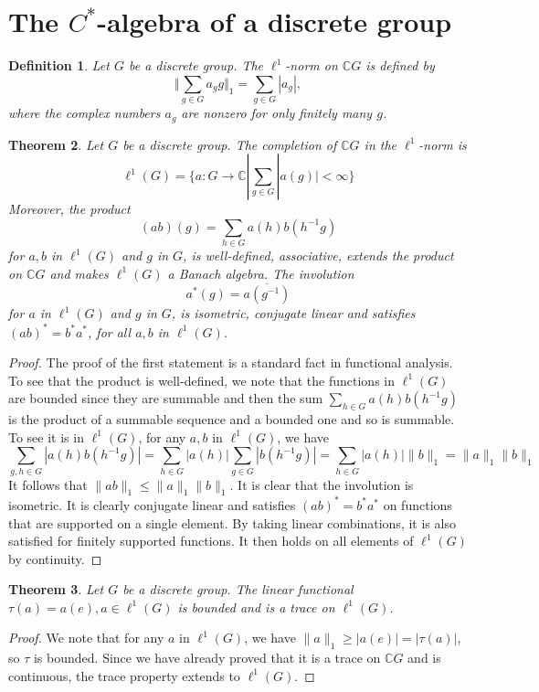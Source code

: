 \documentclass{book}
\newtheorem{definition}{Definition}[section]
\newtheorem{theorem}[definition]{Theorem}
\begin{document}
\section{The \texorpdfstring{\(C^*\)-algebra}{C*algebra} of a discrete group}
\begin{definition}
  Let \(G\) be a discrete group. The \(\ell^1\)-norm on \(\mathbb{C}G\) is defined
  by
  \[\Vert {\sum_{g\in G} a_g g}\Vert_1 =\sum_{g\in G}|a_g|,\]
  where the complex numbers \(a_g\) are nonzero for only finitely many \(g\).
\end{definition}
\begin{theorem}
  Let \(G\) be a discrete group. The completion of \(\mathbb{C}G\) in the
  \(\ell^1\)-norm is
  \[
  \ell^1(G)=\{a:G\rightarrow\mathbb{C}| \sum_{g\in G}|a(g)|<\infty\}
  \]
  Moreover, the product
  \[
  (ab)(g)=\sum_{h\in G}a(h)b(h^{-1}g)
  \]
  for \(a,b\) in \(\ell^1(G)\) and \(g\) in \(G\), is well-defined, associative, extends the product
  on \(\mathbb{C}G\) and makes \(\ell^1(G)\) a Banach algebra. The involution
  \[a^*(g) =\overline{a(g^{-1})}\]
  for \(a\) in \(\ell^1(G)\) and \(g\) in \(G\), is isometric, conjugate linear and satisfies 
  \({(ab)}^* = b^*a^*\), for all \(a,b\) in \(\ell^1(G)\).
\end{theorem}
\begin{proof}
  The proof of the first statement is a standard fact in functional analysis. 
  To see that the product is well-defined, we
  note that the functions in \(\ell^1(G)\) are bounded since they are summable and
  then the sum \(\sum_{h\in G} a(h)b(h^{-1}g)\) is the product of a summable sequence and
  a bounded one and so is summable. To see it is in \(\ell^1(G)\), for any \(a,b\) in \(\ell^1(G)\),
  we have
  \[
  \sum_{g,h\in G}|a(h)b(h^{-1}g)|=\sum_{h\in G}|a(h)|\sum_{g\in G}|b(h^{-1}g)|=\sum_{h\in G}|a(h)| \|b\|_1=\|a\|_1\|b\|_1
  \]
  It follows that \(\|ab\|_1 \leq \|a\|_1 \|b\|_1\). It is clear that the involution is isometric.
  It is clearly conjugate linear and satisfies \({(ab)}^* = b^*a^*\) on functions that
  are supported on a single element. By taking linear combinations, it is also
  satisfied for finitely supported functions. It then holds on all elements of \(\ell^1(G)\) by continuity.
\end{proof}
\begin{theorem}
  Let \(G\) be a discrete group. The linear functional \(\tau(a) =
  a(e), a \in \ell^1(G)\) is bounded and is a trace on \(\ell^1(G)\).
\end{theorem}
\begin{proof}
  We note that for any \(a\) in \(\ell^1(G)\), we have \(\|a\|_1 \geq |a(e)| = |\tau(a)|\), so
  \(\tau\) is bounded. Since we have already proved that it is a trace on \(\mathbb{C}G\) and is
  continuous, the trace property extends to \(\ell^1(G)\).
\end{proof}
\end{document}
